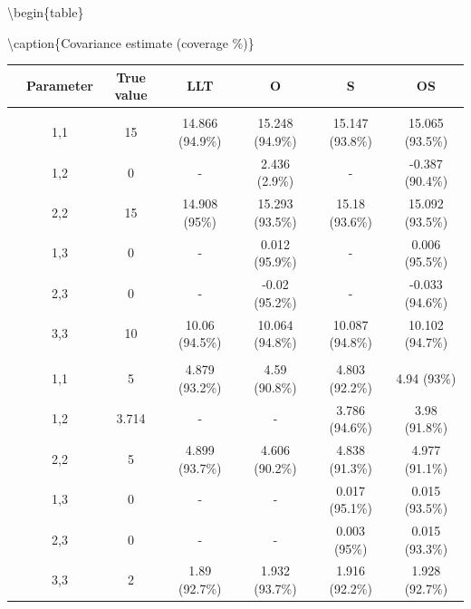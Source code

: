 \documentclass[
]{article}
\begin{document}
\textbackslash begin\{table\}

\textbackslash caption\{\label{tab:unnamed-chunk-27}Covariance estimate (coverage \%)\}
\centering

\begin{tabular}[t]{ccccccc}
\toprule
 & Parameter & True value & LLT & O & S & OS\\
\midrule
\addlinespace[0.3em]
\multicolumn{7}{l}{\textbf{Observation Error}}\\
\hspace{1em} & 1,1 & 15 & 14.866 (94.9\%) & 15.248 (94.9\%) & 15.147 (93.8\%) & 15.065 (93.5\%)\\
\cmidrule{2-7}
\hspace{1em} & 1,2 & 0 & - & 2.436 (2.9\%) & - & -0.387 (90.4\%)\\
\cmidrule{2-7}
\hspace{1em} & 2,2 & 15 & 14.908 (95\%) & 15.293 (93.5\%) & 15.18 (93.6\%) & 15.092 (93.5\%)\\
\cmidrule{2-7}
\hspace{1em} & 1,3 & 0 & - & 0.012 (95.9\%) & - & 0.006 (95.5\%)\\
\cmidrule{2-7}
\hspace{1em} & 2,3 & 0 & - & -0.02 (95.2\%) & - & -0.033 (94.6\%)\\
\cmidrule{2-7}
\hspace{1em} & 3,3 & 10 & 10.06 (94.5\%) & 10.064 (94.8\%) & 10.087 (94.8\%) & 10.102 (94.7\%)\\
\cmidrule{1-7}
\addlinespace[0.3em]
\multicolumn{7}{l}{\textbf{State Process}}\\
\hspace{1em} & 1,1 & 5 & 4.879 (93.2\%) & 4.59 (90.8\%) & 4.803 (92.2\%) & 4.94 (93\%)\\
\cmidrule{2-7}
\hspace{1em} & 1,2 & 3.714 & - & - & 3.786 (94.6\%) & 3.98 (91.8\%)\\
\cmidrule{2-7}
\hspace{1em} & 2,2 & 5 & 4.899 (93.7\%) & 4.606 (90.2\%) & 4.838 (91.3\%) & 4.977 (91.1\%)\\
\cmidrule{2-7}
\hspace{1em} & 1,3 & 0 & - & - & 0.017 (95.1\%) & 0.015 (93.5\%)\\
\cmidrule{2-7}
\hspace{1em} & 2,3 & 0 & - & - & 0.003 (95\%) & 0.015 (93.3\%)\\
\cmidrule{2-7}
\hspace{1em} & 3,3 & 2 & 1.89 (92.7\%) & 1.932 (93.7\%) & 1.916 (92.2\%) & 1.928 (92.7\%)\\
\bottomrule
\end{tabular}
\end{document}
